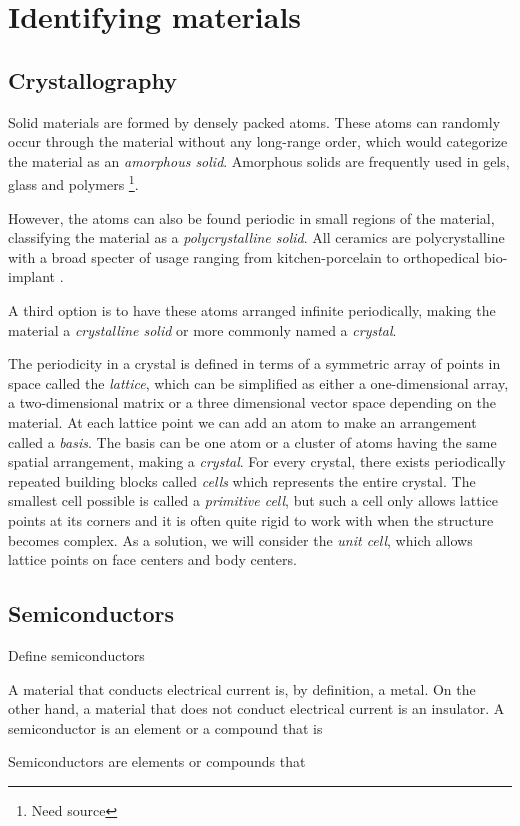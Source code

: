 \chapter{Identifying materials}
\section{Crystallography}

Solid materials are formed by densely packed atoms. These atoms can randomly occur through the material without any long-range order, which would categorize the material as an \textit{amorphous solid}. Amorphous solids are frequently used in gels, glass and polymers \footnote{Need source}.

However, the atoms can also be found periodic in small regions of the material, classifying the material as a \textit{polycrystalline solid}. All ceramics are polycrystalline with a broad specter of usage ranging from kitchen-porcelain to orthopedical bio-implant \cite{Renganathan2018}.

A third option is to have these atoms arranged infinite periodically, making the material a \textit{crystalline solid} or more commonly named a \textit{crystal}.

The periodicity in a crystal is defined in terms of a symmetric array of points in space called the \textit{lattice}, which can be simplified as either a one-dimensional array, a two-dimensional matrix or a three dimensional vector space depending on the material. At each lattice point we can add an atom to make an arrangement called a \textit{basis}. The basis can be one atom or a cluster of atoms having the same spatial arrangement, making a \textit{crystal}. For every crystal, there exists periodically repeated building blocks called \textit{cells} which represents the entire crystal. The smallest cell possible is called a \textit{primitive cell}, but such a cell only allows lattice points at its corners and it is often quite rigid to work with when the structure becomes complex. As a solution, we will consider the \textit{unit cell}, which allows lattice points on face centers and body centers.


\section{Semiconductors}

Define semiconductors

A material that conducts electrical current is, by definition, a metal. On the other hand, a material that does not conduct electrical current is an insulator. A semiconductor is an element or a compound that is

Semiconductors are elements or compounds that
